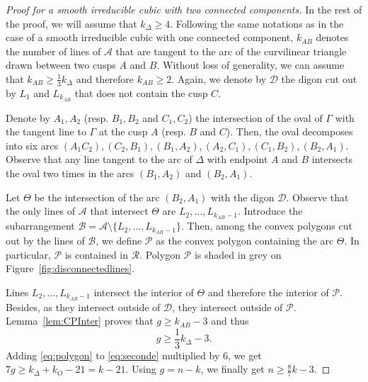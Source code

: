 \documentclass[a4paper,11pt,reqno]{amsart}
\theoremstyle{definition}
\theoremstyle{remark}
\theoremstyle{definition}
\theoremstyle{definition}
\theoremstyle{definition}
\numberwithin{equation}{section}
\begin{document}
\begin{proof}[Proof for a smooth irreducible cubic with two connected components]
In the rest of the proof, we will assume that $k_{\Delta} \geq 4$. Following the same notations as in the case of a smooth irreducible cubic with one connected component, $k_{AB}$ denotes the number of lines of $\mathcal{A}$ that are tangent to the arc of the curvilinear triangle drawn between two cusps $A$ and $B$. Without loss of generality, we can assume that $k_{AB} \geq \frac{1}{3}k_{\Delta}$ and therefore $k_{AB} \geq 2$. Again, we denote by $\mathcal{D}$ the digon cut out by $L_{1}$ and $L_{k_{AB}}$ that does not contain the cusp $C$.
\par
Denote by $A_{1},A_{2}$ (resp. $B_{1},B_{2}$ and $C_{1},C_{2}$) the intersection of the oval of $\Gamma$ with the tangent line to $\Gamma$ at the cusp $A$ (resp. $B$ and $C$). Then, the oval decomposes into six arcs $(A_{1}C_{2}),(C_{2},B_{1}),(B_{1},A_{2}),(A_{2},C_{1}),(C_{1},B_{2}),(B_{2},A_{1})$. Observe that any line tangent to the arc of $\Delta$ with endpoint $A$ and $B$ intersects the oval two times in the arcs $(B_{1},A_{2})$ and $(B_{2},A_{1})$. 
\par
Let $\Theta$ be the intersection of the arc $(B_{2},A_{1})$ with the digon $\mathcal{D}$. Observe that the only lines of $\mathcal{A}$ that intersect $\Theta$ are $L_{2},\dots,L_{k_{AB}-1}$. Introduce the subarrangement $\mathcal{B} = \mathcal{A} \setminus \lbrace{ L_{2},\dots,L_{k_{AB}-1} \rbrace}$. Then, among the convex polygons cut out by the lines of $\mathcal{B}$, we define $\mathcal{P}$ as the convex polygon containing the arc $\Theta$. In particular, $\mathcal{P}$ is contained in $\mathcal{R}$. Polygon $\mathcal{P}$ is shaded in grey on Figure~\ref{fig:disconnectedlines}.
\par
Lines $L_{2},\dots,L_{k_{AB}-1}$ intersect the interior of $\Theta$ and therefore the interior of $\mathcal{P}$. Besides, as they intersect outside of $\mathcal{D}$, they intersect outside of $\mathcal{P}$. Lemma~\ref{lem:CPInter} proves that $g \geq k_{AB}-3$ and thus
\begin{equation}\label{eq:seconde}
g \geq \frac{1}{3}k_{\Delta}-3.    
\end{equation}
Adding \eqref{eq:polygon} to \eqref{eq:seconde} multiplied by $6$, we get $7g \geq k_{\Delta} + k_{O} -21=k-21$. Using  $g=n-k$, we finally get $n \geq \frac{8}{7}k -3$.
\end{proof}
\end{document}
